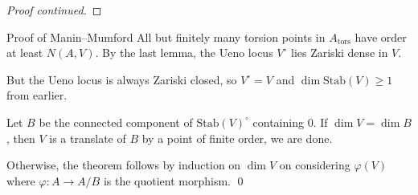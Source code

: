 \documentclass{beamer}
\begin{document}
\begin{frame}
  \begin{proof}[Proof continued]
    \vspace{6cm}



  \end{proof}

\end{frame}

\begin{frame}{Proof of Manin--Mumford}  
  All but finitely many torsion
  points in $A_{\mathrm{tors}}$ have order at least $N(A,V)$.  
  By the last lemma,
  the Ueno locus $V^{\circ}$ lies Zariski dense in $V$.

  But the Ueno locus is always Zariski closed, so 
  $V^{\circ}=V$ and
  $\dim \mathrm{Stab}(V) \ge 1$ from earlier.

  Let $B$ be the connected component of $\mathrm{Stab}(V)^{\circ}$
  containing $0$.
  If $\dim V = \dim B$, then $V$ is a translate of $B$ by a point of
  finite order, we are done.

  Otherwise, the theorem follows by induction on $\dim V$ on
  considering
  $\varphi(V)$ where 
    $\varphi\colon A\rightarrow A/B$ is the quotient morphism. \qed
\end{frame}
\end{document}
